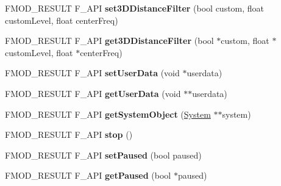 \begin{DoxyCompactItemize}
\item 
\hypertarget{class_f_m_o_d_1_1_channel_control_a50cdfb6d2c4e85d3c5b44114925b3950}{F\+M\+O\+D\+\_\+\+R\+E\+S\+U\+L\+T F\+\_\+\+A\+P\+I {\bfseries set3\+D\+Distance\+Filter} (bool custom, float custom\+Level, float center\+Freq)}\label{class_f_m_o_d_1_1_channel_control_a50cdfb6d2c4e85d3c5b44114925b3950}

\item 
\hypertarget{class_f_m_o_d_1_1_channel_control_aff53b60321028184b7509c284e4fa67d}{F\+M\+O\+D\+\_\+\+R\+E\+S\+U\+L\+T F\+\_\+\+A\+P\+I {\bfseries get3\+D\+Distance\+Filter} (bool $\ast$custom, float $\ast$custom\+Level, float $\ast$center\+Freq)}\label{class_f_m_o_d_1_1_channel_control_aff53b60321028184b7509c284e4fa67d}

\item 
\hypertarget{class_f_m_o_d_1_1_channel_control_adf3e88adc768c9510527271074f6f4f5}{F\+M\+O\+D\+\_\+\+R\+E\+S\+U\+L\+T F\+\_\+\+A\+P\+I {\bfseries set\+User\+Data} (void $\ast$userdata)}\label{class_f_m_o_d_1_1_channel_control_adf3e88adc768c9510527271074f6f4f5}

\item 
\hypertarget{class_f_m_o_d_1_1_channel_control_ab3b41084c9c3411bd4560177186eca5d}{F\+M\+O\+D\+\_\+\+R\+E\+S\+U\+L\+T F\+\_\+\+A\+P\+I {\bfseries get\+User\+Data} (void $\ast$$\ast$userdata)}\label{class_f_m_o_d_1_1_channel_control_ab3b41084c9c3411bd4560177186eca5d}

\item 
\hypertarget{class_f_m_o_d_1_1_channel_control_a8364d9a55bf85d03de5813f17a074e5a}{F\+M\+O\+D\+\_\+\+R\+E\+S\+U\+L\+T F\+\_\+\+A\+P\+I {\bfseries get\+System\+Object} (\hyperlink{class_f_m_o_d_1_1_system}{System} $\ast$$\ast$system)}\label{class_f_m_o_d_1_1_channel_control_a8364d9a55bf85d03de5813f17a074e5a}

\item 
\hypertarget{class_f_m_o_d_1_1_channel_control_a5eb6a02a08058a217a9149b5f9051b51}{F\+M\+O\+D\+\_\+\+R\+E\+S\+U\+L\+T F\+\_\+\+A\+P\+I {\bfseries stop} ()}\label{class_f_m_o_d_1_1_channel_control_a5eb6a02a08058a217a9149b5f9051b51}

\item 
\hypertarget{class_f_m_o_d_1_1_channel_control_a648b799ac7258df17d2a9aa362561aa2}{F\+M\+O\+D\+\_\+\+R\+E\+S\+U\+L\+T F\+\_\+\+A\+P\+I {\bfseries set\+Paused} (bool paused)}\label{class_f_m_o_d_1_1_channel_control_a648b799ac7258df17d2a9aa362561aa2}

\item 
\hypertarget{class_f_m_o_d_1_1_channel_control_a8e1963bd761bf482e10a6a9835bcfdd2}{F\+M\+O\+D\+\_\+\+R\+E\+S\+U\+L\+T F\+\_\+\+A\+P\+I {\bfseries get\+Paused} (bool $\ast$paused)}\label{class_f_m_o_d_1_1_channel_control_a8e1963bd761bf482e10a6a9835bcfdd2}


\end{DoxyCompactItemize}
